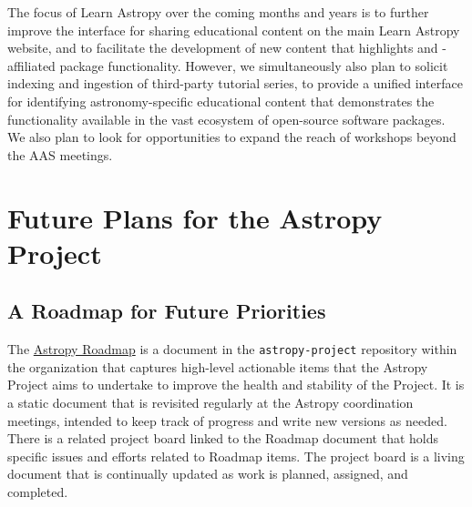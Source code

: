 \documentclass[modern]{aastex631}
\newcommand{\secauthor}[1]{{\color{blue}Author:~\textit{#1}}}
\begin{document}
The focus of Learn Astropy over the coming months and years is to further
improve the interface for sharing educational content on the main Learn Astropy
website, and to facilitate the development of new content that highlights
\astropypkg and \astropy-affiliated package functionality.
However, we simultaneously also plan to solicit indexing and ingestion of
third-party tutorial series, to provide a unified interface for identifying
astronomy-specific educational content that demonstrates the functionality
available in the vast ecosystem of open-source software packages.
We also plan to look for opportunities to expand the reach of \astropy workshops
beyond the AAS meetings.


\section{Future Plans for the Astropy Project} \label{sec:future}

\subsection{A Roadmap for Future Priorities}

The
\href{https://github.com/astropy/astropy-project/blob/main/roadmap/roadmap.md}{Astropy Roadmap} is a document in the \texttt{astropy-project} \github
repository within the \astropy organization that captures high-level actionable
items that the Astropy Project aims to undertake to improve the health and
stability of the Project. It is a static document that is revisited regularly at
the Astropy coordination meetings, intended to keep track of progress and write
new versions as needed. There is a related project board linked to the Roadmap
document that holds specific issues and efforts related to Roadmap items. The
project board is a living document that is continually updated as work is
planned, assigned, and completed.
\end{document}
